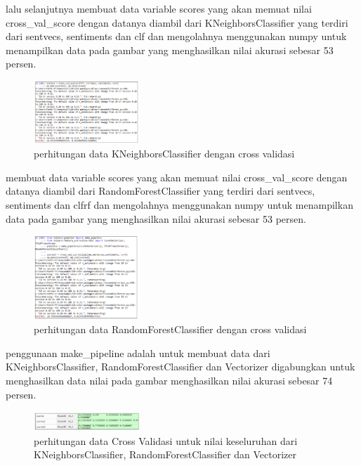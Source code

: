 \begin{enumerate}
\subitem lalu selanjutnya membuat data variable scores yang akan memuat nilai cross\_val\_score dengan datanya diambil dari KNeighborsClassifier yang terdiri dari sentvecs, sentiments dan clf dan mengolahnya menggunakan numpy untuk menampilkan data pada gambar yang menghasilkan nilai akurasi sebesar 53 persen.
\begin{figure}[H]
\includegraphics[width=4cm]{figures/1174002/chapter5/33.png}
\centering
\caption{perhitungan data KNeighborsClassifier dengan cross validasi}
\end{figure}

\subitem membuat data variable scores yang akan memuat nilai cross\_val\_score dengan datanya diambil dari RandomForestClassifier yang terdiri dari sentvecs, sentiments dan clfrf dan mengolahnya menggunakan numpy untuk menampilkan data pada gambar yang menghasilkan nilai akurasi sebesar 53 persen. 
\begin{figure}[H]
\includegraphics[width=4cm]{figures/1174002/chapter5/34.png}
\centering
\caption{perhitungan data RandomForestClassifier dengan cross validasi}
\end{figure}

\subitem penggunaan make\_pipeline adalah untuk membuat data dari KNeighborsClassifier, RandomForestClassifier dan Vectorizer digabungkan untuk menghasilkan data nilai pada gambar menghasilkan nilai akurasi sebesar 74 persen. 
\begin{figure}[H]
\includegraphics[width=4cm]{figures/1174002/chapter5/35.png}
\centering
\caption{perhitungan data Cross Validasi untuk nilai keseluruhan dari KNeighborsClassifier, RandomForestClassifier dan Vectorizer}
\end{figure}
\end{enumerate}
